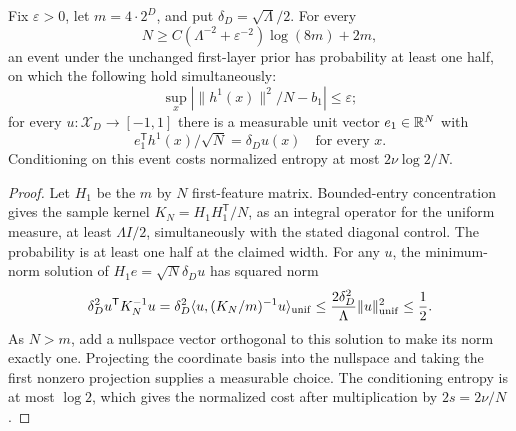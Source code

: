 \begin{lemma}
\label{lem:prefactor-unit-seed}
Fix $\varepsilon>0$, let $m=4\cdot2^D$, and put $\delta_D=\sqrt\Lambda/2$. For every
\[
 N\ge C(\Lambda^{-2}+\varepsilon^{-2})\log(8m)+2m,
\]
an event under the unchanged first-layer prior has probability at least one half, on which the following hold simultaneously:
\[
 \sup_x|\|h^1(x)\|^2/N-b_1|\le\varepsilon;
\]
for every $u:\mathcal X_D\to[-1,1]$ there is a measurable unit vector $e_1\in\mathbb R^N$ with
\[
 e_1^{\mathsf T}h^1(x)/\sqrt N=\delta_Du(x)\quad\text{for every }x.
\]
Conditioning on this event costs normalized entropy at most $2\nu\log2/N$.
\end{lemma}
\begin{proof}
Let $H_1$ be the $m$ by $N$ first-feature matrix. Bounded-entry concentration gives the sample kernel $K_N=H_1H_1^{\mathsf T}/N$, as an integral operator for the uniform measure, at least $\Lambda I/2$, simultaneously with the stated diagonal control. The probability is at least one half at the claimed width. For any $u$, the minimum-norm solution of $H_1e=\sqrt N\delta_Du$ has squared norm
\[
 \delta_D^2u^{\mathsf T}K_N^{-1}u
 =\delta_D^2\langle u,(K_N/m)^{-1}u\rangle_{\rm unif}
 \le\frac{2\delta_D^2}{\Lambda}\|u\|_{\rm unif}^2\le\frac12.
\]
As $N>m$, add a nullspace vector orthogonal to this solution to make its norm exactly one. Projecting the coordinate basis into the nullspace and taking the first nonzero projection supplies a measurable choice. The conditioning entropy is at most $\log2$, which gives the normalized cost after multiplication by $2s=2\nu/N$.
\end{proof}

